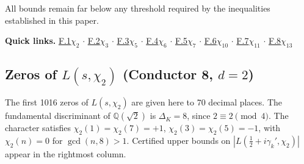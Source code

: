 \documentclass[12pt,reqno]{amsart}
\theoremstyle{remark}
\newcommand{\Q}{\mathbb{Q}}
\begin{document}
\noindent All bounds remain far below any threshold required by the inequalities established in this paper.

\medskip
\label{sec:quicklinks}
\noindent\textbf{Quick links.}\quad
\hyperref[subsec:chi2]{F.1\;$\chi_2$} \;$\cdot$\;
\hyperref[subsec:chi3]{F.2\;$\chi_3$} \;$\cdot$\;
\hyperref[subsec:chi5]{F.3\;$\chi_5$} \;$\cdot$\;
\hyperref[subsec:chi6]{F.4\;$\chi_6$} \;$\cdot$\;
\hyperref[subsec:chi7]{F.5\;$\chi_7$} \;$\cdot$\;
\hyperref[subsec:chi10]{F.6\;$\chi_{10}$} \;$\cdot$\;
\hyperref[subsec:chi11]{F.7\;$\chi_{11}$} \;$\cdot$\;
\hyperref[subsec:chi13]{F.8\;$\chi_{13}$}

\bigskip
\subsection{Zeros of \texorpdfstring{$L(s,\chi_2)$}{L(s,chi2)} (Conductor 8, \texorpdfstring{$d = 2$}{d=2})}
\label{subsec:chi2}

The first 1016 zeros of $L(s,\chi_2)$ are given here to 70 decimal places.  The fundamental discriminant of $\Q(\sqrt{2})$ is $\Delta_K = 8$, since $2 \equiv 2 \pmod{4}$.  The character satisfies $\chi_2(1) = \chi_2(7) = +1$, $\chi_2(3) = \chi_2(5) = -1$, with $\chi_2(n) = 0$ for $\gcd(n,8) > 1$.  Certified upper bounds on $|L(\tfrac{1}{2}+i\gamma_k',\chi_2)|$ appear in the rightmost column.
\end{document}
